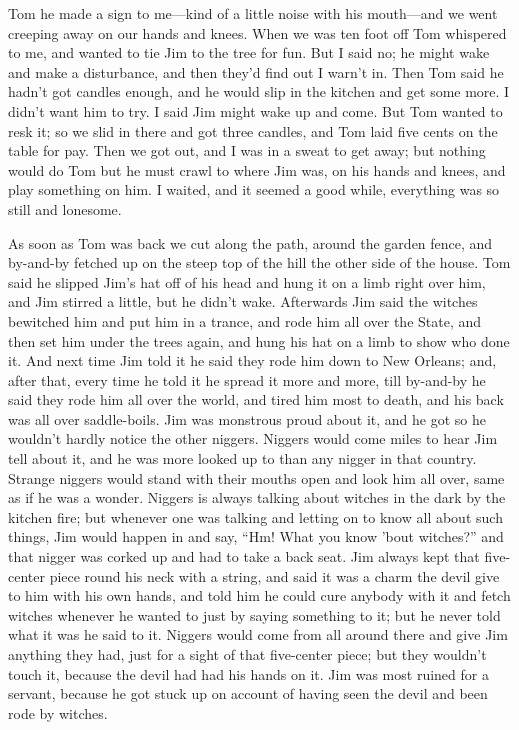 \documentclass[10pt,a4paper]{article}
\begin{document}
Tom he made a sign to me—kind of a little noise with his mouth—and we went creeping away on our hands and knees. When we was ten foot off Tom whispered to me, and wanted to tie Jim to the tree for fun. But I said no; he might wake and make a disturbance, and then they’d find out I warn’t in. Then Tom said he hadn’t got candles enough, and he would slip in the kitchen and get some more. I didn’t want him to try. I said Jim might wake up and come. But Tom wanted to resk it; so we slid in there and got three candles, and Tom laid five cents on the table for pay. Then we got out, and I was in a sweat to get away; but nothing would do Tom but he must crawl to where Jim was, on his hands and knees, and play something on him. I waited, and it seemed a good while, everything was so still and lonesome.

As soon as Tom was back we cut along the path, around the garden fence, and by-and-by fetched up on the steep top of the hill the other side of the house. Tom said he slipped Jim’s hat off of his head and hung it on a limb right over him, and Jim stirred a little, but he didn’t wake. Afterwards Jim said the witches bewitched him and put him in a trance, and rode him all over the State, and then set him under the trees again, and hung his hat on a limb to show who done it. And next time Jim told it he said they rode him down to New Orleans; and, after that, every time he told it he spread it more and more, till by-and-by he said they rode him all over the world, and tired him most to death, and his back was all over saddle-boils. Jim was monstrous proud about it, and he got so he wouldn’t hardly notice the other niggers. Niggers would come miles to hear Jim tell about it, and he was more looked up to than any nigger in that country. Strange niggers would stand with their mouths open and look him all over, same as if he was a wonder. Niggers is always talking about witches in the dark by the kitchen fire; but whenever one was talking and letting on to know all about such things, Jim would happen in and say, “Hm! What you know ’bout witches?” and that nigger was corked up and had to take a back seat. Jim always kept that five-center piece round his neck with a string, and said it was a charm the devil give to him with his own hands, and told him he could cure anybody with it and fetch witches whenever he wanted to just by saying something to it; but he never told what it was he said to it. Niggers would come from all around there and give Jim anything they had, just for a sight of that five-center piece; but they wouldn’t touch it, because the devil had had his hands on it. Jim was most ruined for a servant, because he got stuck up on account of having seen the devil and been rode by witches.
\end{document}
